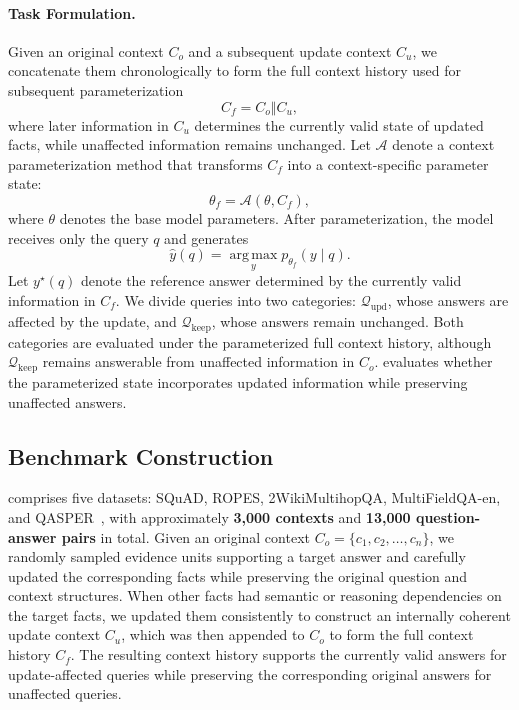 \paragraph{Task Formulation.}
Given an original context $C_o$ and a subsequent update context $C_u$, we concatenate them chronologically to form the full context history used for subsequent parameterization
\begin{equation}C_f = C_o \Vert C_u,\end{equation}
where later information in $C_u$ determines the currently valid state of updated facts, while unaffected information remains unchanged. 
Let $\mathcal{A}$ denote a context parameterization method that transforms $C_f$ into a context-specific parameter state:
\begin{equation}
\theta_f = \mathcal{A}(\theta, C_f),
\label{eq:context-parameterization}
\end{equation}
where $\theta$ denotes the base model parameters. After parameterization, the model receives only the query $q$ and generates
\begin{equation}
\hat{y}(q) = \operatorname*{arg\,max}_{y} p_{\theta_f}(y\mid q).
\label{eq:muse-inference}
\end{equation}
Let $y^\star(q)$ denote the reference answer determined by the currently valid information in $C_f$. 
We divide queries into two categories: $\mathcal{Q}_{\mathrm{upd}}$, whose answers are affected by the update, and $\mathcal{Q}_{\mathrm{keep}}$, whose answers remain unchanged. 
Both categories are evaluated under the parameterized full context history, although $\mathcal{Q}_{\mathrm{keep}}$ remains answerable from unaffected information in $C_o$. \task{} evaluates whether the parameterized state incorporates updated information while preserving unaffected answers.


\subsection{Benchmark Construction}
\label{sec:benchmark-dataset}

\benchmark{} comprises five datasets: SQuAD, ROPES, 2WikiMultihopQA, MultiFieldQA-en, and QASPER~\citep{rajpurkar2016squad,lin2019reasoning,ho2020constructing,bai2024longbench,dasigi2021dataset}, with approximately \textbf{3,000 contexts} and \textbf{13,000 question-answer pairs} in total.
Given an original context $C_o=\{c_1,c_2,\ldots,c_n\}$, we randomly sampled evidence units supporting a target answer and carefully updated the corresponding facts while preserving the original question and context structures. When other facts had semantic or reasoning dependencies on the target facts, we updated them consistently to construct an internally coherent update context $C_u$, which was then appended to $C_o$ to form the full context history $C_f$. The resulting context history supports the currently valid answers for update-affected queries while preserving the corresponding original answers for unaffected queries.


